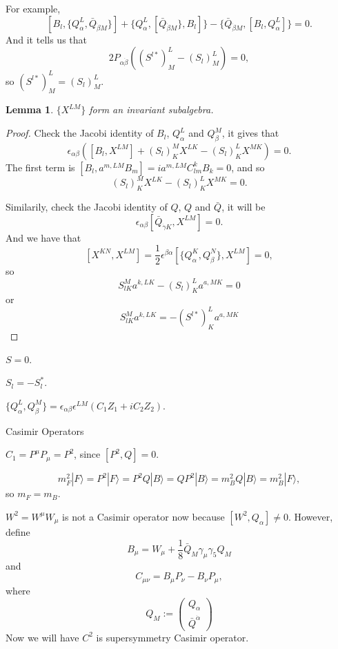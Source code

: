 \documentclass[11pt]{article}
\theoremstyle{definition}
\theoremstyle{plain}
\newtheorem{lem}[para]{Lemma}
\begin{document}
For example,
\[
	[B_l,\{Q_\alpha^L,\bar Q_{\dot \beta M}\}]+\{Q_\alpha^L,[\bar Q_{\dot \beta M}\},B_l]\}-\{\bar Q_{\dot \beta M},[B_l,Q_\alpha^L]\}=0.
\]
And it tells us that
\[
	2P_{\alpha\dot\beta}\left((S^{l*})_M^L-(S_l)_M^L\right)=0,
\]
so $(S^{l*})_M^L=(S_l)_M^L$.

\begin{lem}
$\{X^{LM}\}$ form an invariant subalgebra.
\end{lem}

\begin{proof}
Check the Jacobi identity of $B_l$, $Q_\alpha^L$ and $Q_{\beta}^M$, it 
gives that
\[
	\epsilon_{\alpha\beta}\left(
	[B_l,X^{LM}]+(S_l)^M_K X^{LK}-(S_l)^{L}_K X^{MK}
	\right)=0.
\]
The first term is $[B_l,a^{m,LM}B_m]=ia^{m,LM}C_{lm}^k B_k=0$, and so
\[
	(S_l)^M_K X^{LK}-(S_l)^{L}_K X^{MK}=0.
\]

Similarily, check the Jacobi identity of $Q$, $Q$ and $\bar Q$, it 
will be
\[
	\epsilon_{\alpha\beta}[\bar Q_{\dot\gamma K},X^{LM}]=0.
\]
And we have that 
\[
	[X^{KN},X^{LM}]=\frac 12 \epsilon^{\beta\alpha}[\{Q_{\alpha}^K,Q_\beta^N\},X^{LM}]=0,
\]
so
\[
	S_{lK}^Ma^{k,LK}-(S_l)_{K}^La^{a,MK}=0
\]
or
\[
	S_{lK}^Ma^{k,LK}=-(S^{l*})_{K}^La^{a,MK}
\]
\end{proof}

\begin{compactenum}[(1)]
\item $S=0$.
\item $S_l=-S_l^*$.
\item $\{Q_\alpha^L,Q_\beta^M\}=\epsilon_{\alpha\beta}\epsilon^{LM}(C_1Z_1+iC_2Z_2)$.
\end{compactenum}

\vspace{2ex}

Casimir Operators

\begin{compactenum}[(1)]
\item $C_1=P^\mu P_\mu=P^2$, since $[P^2,Q]=0$.

\[
	m_F^2|F\rangle =P^2|F\rangle=P^2Q|B\rangle
	=QP^2|B\rangle=m_B^2Q|B\rangle=m_B^2|F\rangle,
\]
so $m_F=m_B$.
\item $W^2=W^\mu W_\mu$ is not a Casimir operator now because
$[W^2,Q_\alpha]\neq 0$. However, define
\[
	B_\mu=W_\mu +\frac 18 \bar Q_M \gamma_\mu \gamma_5 Q_M
\]
and
\[
	C_{\mu\nu}=B_\mu P_\nu-B_\nu P_\mu,
\]
where 
\[
	Q_M:=\begin{pmatrix}
	Q_\alpha\\\bar Q^{\dot\alpha}
	\end{pmatrix}
\]	
Now we will have $C^2$ is supersymmetry Casimir operator.
\end{compactenum}
\end{document}
